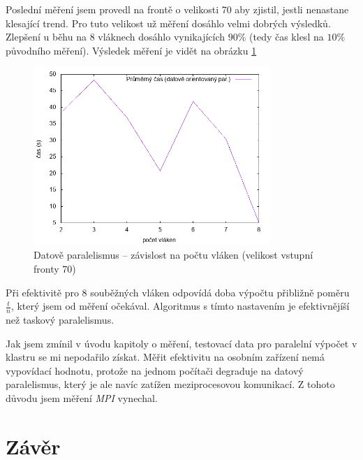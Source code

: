 \documentclass[czech]{article}
\begin{document}
Poslední měření jsem provedl na frontě o velikosti 70 aby zjistil, jestli nenastane klesající trend.
Pro tuto velikost už měření dosáhlo velmi dobrých výsledků.
Zlepšení u běhu na 8 vláknech dosáhlo vynikajících $90\%$ (tedy čas klesl na $10\%$ původního měření).
Výsledek měření je vidět na obrázku \ref{fig:data-2}

\begin{figure}[H]
    \centering
    \includegraphics[width=0.8\textwidth]{assets/parallel-data-oriented-2.png}
    \caption{Datově paralelismus -- závislost na počtu vláken (velikost vstupní fronty 70)}
    \label{fig:data-2}
\end{figure}

Při efektivitě pro 8 souběžných vláken odpovídá doba výpočtu přibližně poměru $\frac{t}{n}$, který jsem od měření očekával.
Algoritmus s tímto nastavením je efektivnějíší než taskový paralelismus.


Jak jsem zmínil v úvodu kapitoly o měření, testovací data pro paralelní výpočet v klastru se mi nepodařilo získat.
Měřit efektivitu na osobním zařízení nemá vypovídací hodnotu, protože na jednom počítači degraduje na datový paralelismus, který je ale navíc zatížen meziprocesovou komunikací.
Z tohoto důvodu jsem měření \textit{MPI} vynechal.

\section{Závěr}
\end{document}
